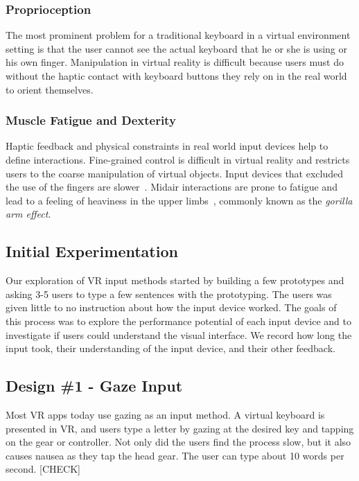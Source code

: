 \subsubsection{Proprioception}
The most prominent problem for a traditional keyboard in a virtual environment setting is that the user cannot see the actual keyboard that he or she is using or his own finger.
Manipulation in virtual reality is difficult because users must do without the haptic contact with keyboard buttons they rely on in the real world to orient themselves.

\subsubsection{Muscle Fatigue and Dexterity}

Haptic feedback and physical constraints in real world input devices help to define interactions. 
Fine-grained control is difficult in virtual reality and restricts users to the coarse manipulation of virtual objects.
Input devices that excluded the use of the fingers are slower~\cite{Zhai:1996:IMG:238386.238534}.  
Midair interactions are prone to fatigue and lead to a feeling
of heaviness in the upper limbs~\cite{Hincapie-Ramos:2014:CEM:2556288.2557130}, commonly known as the \textit{gorilla arm effect}.

\subsection{Initial Experimentation}

Our exploration of VR input methods started by building a few prototypes and asking 3-5 users to type a few sentences with the prototyping.  
The users was given little to no instruction about how the input device worked.
The goals of this process was to explore the performance potential of each input device and to investigate if users could understand the visual interface.
We record how long the input took, their understanding of the input device, and their other feedback.

\subsection{Design \#1 - Gaze Input}
Most VR apps today use gazing as an input method.  A virtual keyboard is presented in VR, and users type a letter by gazing at the desired key and tapping on the gear or controller.  Not only did the users find the process slow, but it also causes nausea as they tap the head gear. 
The user can type about 10 words per second. [CHECK]  

